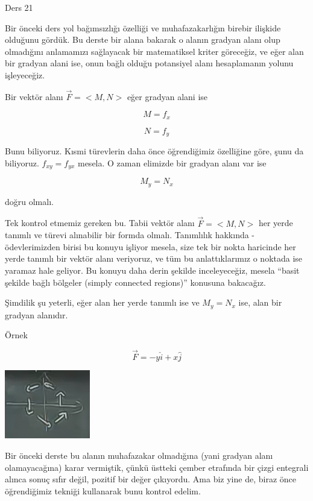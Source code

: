 \documentclass[12pt,fleqn]{article}\usepackage{../../common}
\begin{document}
Ders 21

Bir önceki ders yol bağımsızlığı özelliği ve muhafazakarlığın birebir ilişkide
olduğunu gördük. Bu derste bir alana bakarak o alanın gradyan alanı olup
olmadığını anlamamızı sağlayacak bir matematiksel kriter göreceğiz, ve eğer alan
bir gradyan alani ise, onun bağlı olduğu potansiyel alanı hesaplamanın yolunu
işleyeceğiz.

Bir vektör alanı $\vec{F} = <M,N>$ eğer gradyan alani ise 

$$ M = f_x $$

$$ N = f_y $$

Bunu biliyoruz. Kısmi türevlerin daha önce öğrendiğimiz özelliğine göre, şunu da
biliyoruz. $f_{xy} = f_{yx}$ mesela. O zaman elimizde bir gradyan alanı var ise

$$ M_y = N_x $$

doğru olmalı. 

Tek kontrol etmemiz gereken bu. Tabii vektör alanı $\vec{F} = <M,N>$ her yerde
tanımlı ve türevi alınabilir bir formda olmalı. Tanımlılık hakkında -
ödevlerimizden birisi bu konuyu işliyor mesela, size tek bir nokta haricinde her
yerde tanımlı bir vektör alanı veriyoruz, ve tüm bu anlattıklarımız o noktada
ise yaramaz hale geliyor. Bu konuyu daha derin şekilde inceleyeceğiz, mesela
``basit şekilde bağlı bölgeler (simply connected regions)'' konusuna bakacağız.

Şimdilik şu yeterli, eğer alan her yerde tanımlı ise ve $M_y = N_x$ ise,
alan bir gradyan alanıdır. 

Örnek 

$$ \vec{F} = -y\hat{i} + x\hat{j} $$

\begin{center}

\includegraphics[height=3cm]{21_1.png}

\end{center}

Bir önceki derste bu alanın muhafazakar olmadığına (yani gradyan alanı
olamayacağına) karar vermiştik, çünkü üstteki çember etrafında bir çizgi
entegrali alınca sonuç sıfır değil, pozitif bir değer çıkıyordu. Ama biz yine
de, biraz önce öğrendiğimiz tekniği kullanarak bunu kontrol edelim.
\end{document}

